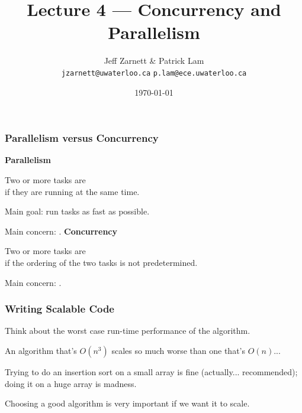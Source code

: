 

\title{Lecture 4 --- Concurrency and Parallelism }

\author{Jeff Zarnett \& Patrick Lam \\ \small \texttt{jzarnett@uwaterloo.ca} \texttt{p.lam@ece.uwaterloo.ca}}
\date{\today}




\begin{frame}
  \titlepage

 \end{frame}

\begin{frame}
  \frametitle{Parallelism versus Concurrency}

  {\bf Parallelism}

  Two or more tasks are \\ \hspace*{2em} if they are running at the same time. 

  Main goal: run tasks as fast as possible. 

  Main concern: .
  \vfill
  {\bf Concurrency}

  Two or more tasks are \\ \hspace*{2em} if the ordering of the two tasks is not 
  predetermined. 

  Main concern: .

\end{frame}




\begin{frame}
\frametitle{Writing Scalable Code}

Think about the worst case run-time performance of the algorithm. 

An algorithm that's $O(n^{3})$ scales so much worse than one that's $O(n)$... 

Trying to do an insertion sort on a small array is fine (actually... recommended); doing it on a huge array is madness.

Choosing a good algorithm is very important if we want it to scale. 

\end{frame}

